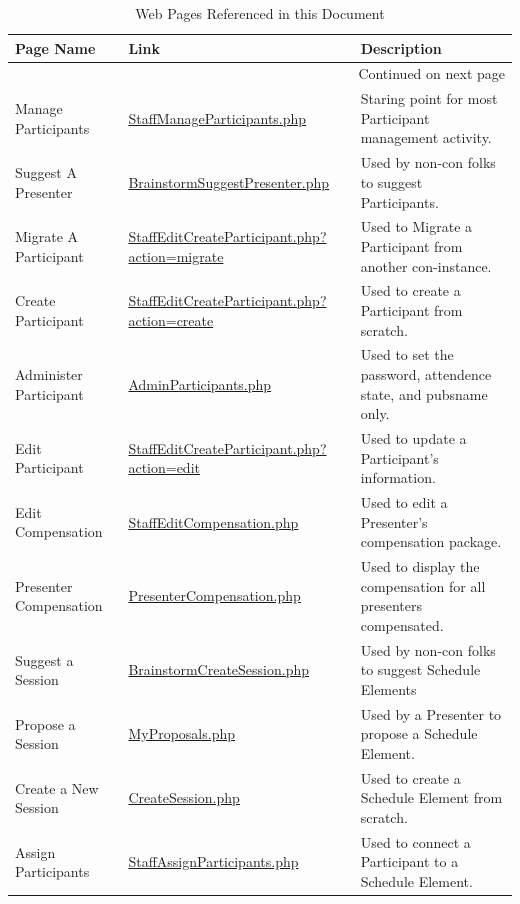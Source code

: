 \documentclass[captions=tablesignature]{scrartcl}
\begin{document}
\begin{small}
\begin{longtable}{|l|l|l|}
\caption{\label{tbl:usefulpages}Web Pages Referenced in this Document}
\\
\hline
Page Name & Link & Description\\
\hline
\endhead
\hline\multicolumn{3}{r}{Continued on next page} \\
\endfoot
\endlastfoot
Manage Participants & \href{../webpages/StaffManageParticipants.php}{StaffManageParticipants.php} & Staring point for most Participant management activity.\\
Suggest A Presenter & \href{../webpages/BrainstormSuggestPresenter.php}{BrainstormSuggestPresenter.php} & Used by non-con folks to suggest Participants.\\
Migrate A Participant & \href{../webpages/StaffEditCreateParticipant.php?action=migrate}{StaffEditCreateParticipant.php?action=migrate} & Used to Migrate a Participant from another con-instance.\\
Create Participant & \href{../webpages/StaffEditCreateParticipant.php?action=create}{StaffEditCreateParticipant.php?action=create} & Used to create a Participant from scratch.\\
Administer Participant & \href{../webpages/AdminParticipants.php}{AdminParticipants.php} & Used to set the password, attendence state, and pubsname only.\\
Edit Participant & \href{../webpages/StaffEditCreateParticipant.php?action=edit}{StaffEditCreateParticipant.php?action=edit} & Used to update a Participant's information.\\
Edit Compensation & \href{../webpages/StaffEditCompensation.php}{StaffEditCompensation.php} & Used to edit a Presenter's compensation package.\\
Presenter Compensation & \href{../webpages/PresenterCompensation.php}{PresenterCompensation.php} & Used to display the compensation for all presenters compensated.\\
Suggest a Session & \href{../webpages/BrainstormCreateSession.php}{BrainstormCreateSession.php} & Used by non-con folks to suggest Schedule Elements\\
Propose a Session & \href{../webpages/MyProposals.php}{MyProposals.php} & Used by a Presenter to propose a Schedule Element.\\
Create a New Session & \href{../webpages/CreateSession.php}{CreateSession.php} & Used to create a Schedule Element from scratch.\\
Assign Participants & \href{../webpages/StaffAssignParticipants.php}{StaffAssignParticipants.php} & Used to connect a Participant to a Schedule Element.\\
\hline
\end{longtable}
\end{small}
\end{document}
